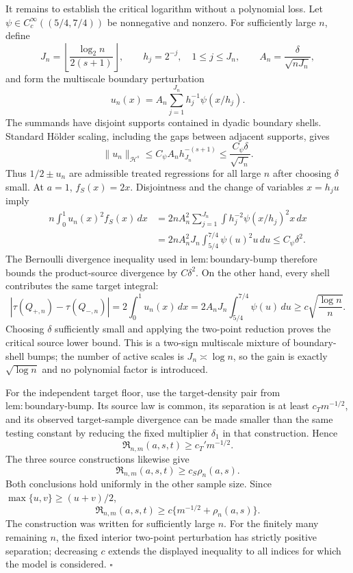 It remains to establish the critical logarithm without a polynomial loss.  Let
\(\psi\in C_c^\infty((5/4,7/4))\) be nonnegative and nonzero.  For sufficiently large \(n\), define
\[
 J_n=\left\lfloor\frac{\log_2 n}{2(s+1)}\right\rfloor,
 \qquad h_j=2^{-j},\quad 1\le j\le J_n,
 \qquad A_n=\frac{\delta}{\sqrt{nJ_n}},
\]
and form the multiscale boundary perturbation
\[
 u_n(x)=A_n\sum_{j=1}^{J_n}h_j^{-1}\psi(x/h_j).
\]
The summands have disjoint supports contained in dyadic boundary shells.  Standard H\"older scaling, including the gaps between adjacent supports, gives
\[
 \lVert u_n\rVert_{\mathcal H^s}
 \le C_\psi A_nh_{J_n}^{-(s+1)}
 \le \frac{C_\psi\delta}{\sqrt{J_n}}.
\]
Thus \(1/2\pm u_n\) are admissible treated regressions for all large \(n\) after choosing \(\delta\) small.  At \(a=1\), \(f_S(x)=2x\).  Disjointness and the change of variables \(x=h_ju\) imply
\[
\begin{aligned}
 n\int_0^1u_n(x)^2f_S(x)\,dx
 &=2nA_n^2\sum_{j=1}^{J_n}
   \int h_j^{-2}\psi(x/h_j)^2x\,dx\\
 &=2nA_n^2J_n\int_{5/4}^{7/4}\psi(u)^2u\,du
 \le C_\psi\delta^2.
\end{aligned}
\]
The Bernoulli divergence inequality used in
\(\mathrm{lem:boundary\text{-}bump}\) therefore bounds the product-source divergence by \(C\delta^2\).  On the other hand, every shell contributes the same target integral:
\[
 |\tau(Q_{+,n})-\tau(Q_{-,n})|
 =2\int_0^1u_n(x)\,dx
 =2A_nJ_n\int_{5/4}^{7/4}\psi(u)\,du
 \ge c\sqrt{\frac{\log n}{n}}.
\]
Choosing \(\delta\) sufficiently small and applying the two-point reduction proves the critical source lower bound.  This is a two-sign multiscale mixture of boundary-shell bumps; the number of active scales is \(J_n\asymp\log n\), so the gain is exactly \(\sqrt{\log n}\) and no polynomial factor is introduced.

For the independent target floor, use the target-density pair from
\(\mathrm{lem:boundary\text{-}bump}\).  Its source law is common, its separation is at least \(c_Tm^{-1/2}\), and its observed target-sample divergence can be made smaller than the same testing constant by reducing the fixed multiplier \(\delta_1\) in that construction.  Hence
\[
 \mathfrak R_{n,m}(a,s,t)\ge c_T'm^{-1/2}.
\]
The three source constructions likewise give
\[
 \mathfrak R_{n,m}(a,s,t)\ge c_S\rho_n(a,s).
\]
Both conclusions hold uniformly in the other sample size.  Since
\(\max\{u,v\}\ge(u+v)/2\),
\[
 \mathfrak R_{n,m}(a,s,t)
 \ge c\{m^{-1/2}+\rho_n(a,s)\}.
\]
The construction was written for sufficiently large \(n\).  For the finitely many remaining \(n\), the fixed interior two-point perturbation has strictly positive separation; decreasing \(c\) extends the displayed inequality to all indices for which the model is considered. \(\square\)